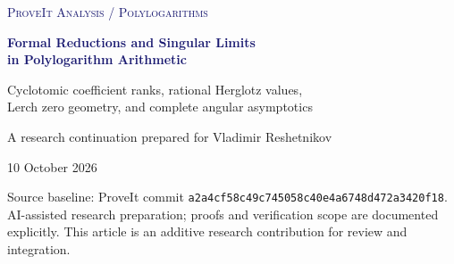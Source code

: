 \documentclass[11pt,a4paper]{article}
\theoremstyle{definition}
\theoremstyle{remark}
\numberwithin{equation}{section}
\begin{document}
\hypersetup{pageanchor=false}
\begin{titlepage}
\thispagestyle{empty}
\setlength{\parindent}{0pt}
\vspace*{12mm}
{\small\scshape\textcolor{midnightblue}{ProveIt \quad Analysis / Polylogarithms}\par}
\vspace{9mm}
{\LARGE\bfseries\textcolor{midnightblue}{Formal Reductions and Singular Limits\\[3mm] in Polylogarithm Arithmetic}\par}
\vspace{8mm}
{\large Cyclotomic coefficient ranks, rational Herglotz values,\\[1mm]
Lerch zero geometry, and complete angular asymptotics\par}
\vspace{12mm}
{\normalsize A research continuation prepared for Vladimir Reshetnikov\par}
\vspace{2mm}
{\normalsize 10 October 2026\par}
\vspace{13mm}
\begin{abstract}
We continue the ProveIt polylogarithm manuscript at a fixed repository
snapshot, distinguishing newly proved results from recently completed
incoming research. We prove its odd-weight Gaussian coefficient-rank
conjecture, determine the even-weight ranks, and construct a canonical
same-point splitting at every cyclotomic level. For the companion
Herglotz integral $J(p/q)$, we give a complete rational-dilogarithm and
logarithmic classification in the manuscript's rationalized five-term
calculus, together with explicit positive-real evaluations. For
differentiated Lerch logarithmic sums, we classify every small-parameter
zero pattern, prove the optimal uniform threshold $K_2=1$, exhibit a
nonmonotone zero branch, and compute the first singular Abel coefficient
and the exact endpoint regularity of simple zero branches. Finally,
we construct the angular-zero expansion to every exponential order,
uniformly in the second index, and prove that its untruncated series
diverges at every fixed first index. Exact coefficient generators, rational sign certificates, independent numerical diagnostics, a narrow
editorial patch, and a proposed research program accompany the proofs.
Formal relation ranks and five-term obstructions are kept distinct from
unproved independence statements about numerical periods.
\end{abstract}
\vfill
{\small\textcolor{quietgray}{Source baseline: ProveIt commit
\texttt{a2a4cf58c49c745058c40e4a6748d472a3420f18}.\\[2mm]
AI-assisted research preparation; proofs and verification scope are
documented explicitly. This article is an additive research contribution
for review and integration.}\par}
\end{titlepage}
\end{document}
